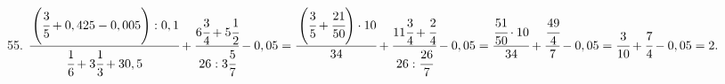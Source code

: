 55. $\cfrac{\left(\cfrac{3}{5}+0,425-0,005\right):0,1}{\cfrac{1}{6}+3\cfrac{1}{3}+30,5}+\cfrac{6\cfrac{3}{4}+5\cfrac{1}{2}}{26:3\cfrac{5}{7}}-0,05=
\cfrac{\left(\cfrac{3}{5}+\cfrac{21}{50}\right)\cdot10}{34}+\cfrac{11\cfrac{3}{4}+\cfrac{2}{4}}{26:\cfrac{26}{7}}-0,05=
\cfrac{\cfrac{51}{50}\cdot10}{34}+\cfrac{\cfrac{49}{4}}{7}-0,05=
\cfrac{3}{10}+\cfrac{7}{4}-0,05=2.$\\
